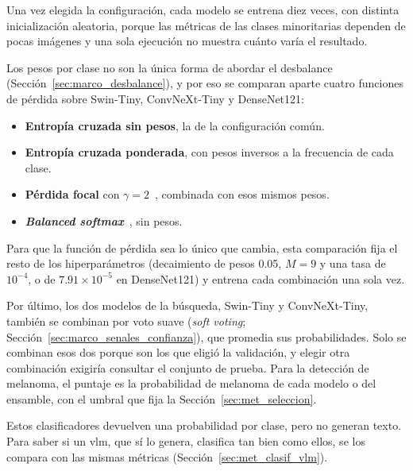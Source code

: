 Una vez elegida la configuración, cada modelo se entrena diez veces, con distinta inicialización aleatoria, porque las
métricas de las clases minoritarias dependen de pocas imágenes y una sola ejecución no muestra cuánto varía el
resultado.

Los pesos por clase no son la única forma de abordar el desbalance (Sección~\ref{sec:marco_desbalance}), y por eso se
comparan aparte cuatro funciones de pérdida sobre Swin-Tiny, ConvNeXt-Tiny y DenseNet121:
\begin{itemize}
    \item \textbf{Entropía cruzada sin pesos}, la de la configuración común.
    \item \textbf{Entropía cruzada ponderada}, con pesos inversos a la frecuencia de cada clase.
    \item \textbf{Pérdida focal} con $\gamma = 2$~\cite{lin2017focal}, combinada con esos mismos pesos.
    \item \textbf{\emph{Balanced softmax}}~\cite{ren2020balanced}, sin pesos.
\end{itemize}
Para que la función de pérdida sea lo único que cambia, esta comparación fija el resto de los hiperparámetros
(decaimiento de pesos 0.05, $M = 9$ y una tasa de $10^{-4}$, o de $7.91 \times 10^{-5}$ en DenseNet121) y entrena
cada combinación una sola vez.

Por último, los dos modelos de la búsqueda, Swin-Tiny y ConvNeXt-Tiny, también se combinan por voto suave
(\emph{soft voting}; Sección~\ref{sec:marco_senales_confianza}), que promedia sus probabilidades. Solo se combinan esos
dos porque son los que eligió la validación, y elegir otra combinación exigiría consultar el conjunto de prueba. Para la detección
de melanoma, el puntaje es la probabilidad de melanoma de cada modelo o del ensamble, con el umbral que fija la
Sección~\ref{sec:met_seleccion}.

Estos clasificadores devuelven una probabilidad por clase, pero no generan texto. Para saber si un \gls{vlm}, que sí lo
genera, clasifica tan bien como ellos, se los compara con las mismas métricas (Sección~\ref{sec:met_clasif_vlm}).
